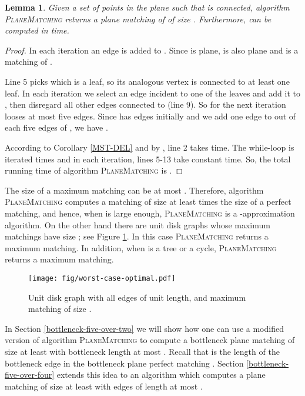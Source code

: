 \documentclass[11pt,a4paper]{article}
\newtheorem{lemma}{Lemma}
\begin{document}
\begin{lemma}
\label{n-minus-one-lemma}
Given a set  of  points in the plane such that  is connected, algorithm {\scshape PlaneMatching} returns a plane matching  of  of size . Furthermore,  can be computed in  time.
\end{lemma}
\begin{proof}
In each iteration an edge  is added to . Since  is plane,  is also plane and  is a matching of .

Line 5 picks  which is a leaf, so its analogous vertex  is connected to at least one leaf. In each iteration we select an edge incident to one of the leaves and add it to , then disregard all other edges connected to  (line 9). So for the next iteration  looses at most five edges. Since  has  edges initially and we add one edge to  out of each five edges of , we have . 

According to Corollary \ref{MST-DEL} and by \cite{Monma1992}, line 2 takes  time. The while-loop is iterated  times and in each iteration, lines 5-13 take constant time. So, the total running time of algorithm {\scshape PlaneMatching} is . 
\end{proof}

The size of a maximum matching can be at most . Therefore, algorithm {\scshape PlaneMatching} computes a matching of size at least  times the size of a perfect matching, and hence, when  is large enough, {\scshape PlaneMatching} is a -approximation algorithm. On the other hand there are unit disk graphs whose maximum matchings have size ; see Figure \ref{worst-case-optimal}. In this case {\scshape PlaneMatching} returns a maximum matching. In addition, when  is a tree or a cycle, {\scshape PlaneMatching} returns a maximum matching. 

\begin{figure}[ht]
  \centering
    \texttt{[image: fig/worst-case-optimal.pdf]}
  \caption{Unit disk graph with all edges of unit length, and maximum matching of size .}
\label{worst-case-optimal}
\end{figure}

In Section \ref{bottleneck-five-over-two} we will show how one can use a modified version of algorithm {\scshape PlaneMatching} to compute a bottleneck plane matching of size at least  with bottleneck length at most . Recall that  is the length of the bottleneck edge in the bottleneck plane perfect matching . Section \ref{bottleneck-five-over-four} extends this idea to an algorithm which computes a plane matching of size at least  with edges of length at most .
\end{document}
